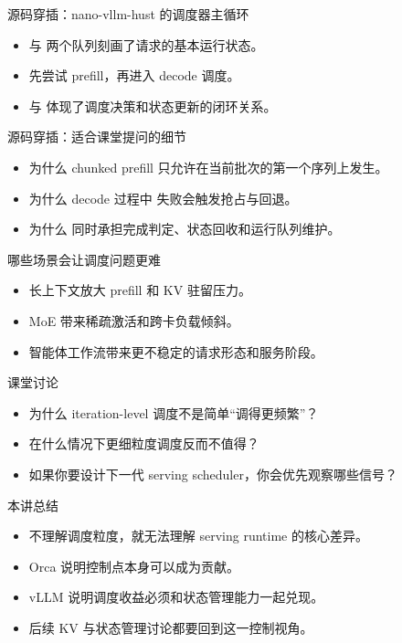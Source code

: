 \begin{frame}{源码穿插：nano-vllm-hust 的调度器主循环}
  \begin{itemize}
    \item \texttt{} 与 \texttt{} 两个队列刻画了请求的基本运行状态。
    \item \texttt{} 先尝试 prefill，再进入 decode 调度。
    \item \texttt{} 与 \texttt{} 体现了调度决策和状态更新的闭环关系。
  \end{itemize}
\end{frame}

\begin{frame}{源码穿插：适合课堂提问的细节}
  \begin{itemize}
    \item 为什么 chunked prefill 只允许在当前批次的第一个序列上发生。
    \item 为什么 decode 过程中 \texttt{} 失败会触发抢占与回退。
    \item 为什么 \texttt{} 同时承担完成判定、状态回收和运行队列维护。
  \end{itemize}
\end{frame}

\begin{frame}{哪些场景会让调度问题更难}
  \begin{itemize}
    \item 长上下文放大 prefill 和 KV 驻留压力。
    \item MoE 带来稀疏激活和跨卡负载倾斜。
    \item 智能体工作流带来更不稳定的请求形态和服务阶段。
  \end{itemize}
\end{frame}



\begin{frame}{课堂讨论}
  \begin{itemize}
    \item 为什么 iteration-level 调度不是简单“调得更频繁”？
    \item 在什么情况下更细粒度调度反而不值得？
    \item 如果你要设计下一代 serving scheduler，你会优先观察哪些信号？
  \end{itemize}
\end{frame}

\begin{frame}{本讲总结}
  \begin{itemize}
    \item 不理解调度粒度，就无法理解 serving runtime 的核心差异。
    \item Orca 说明控制点本身可以成为贡献。
    \item vLLM 说明调度收益必须和状态管理能力一起兑现。
    \item 后续 KV 与状态管理讨论都要回到这一控制视角。
  \end{itemize}
\end{frame}

